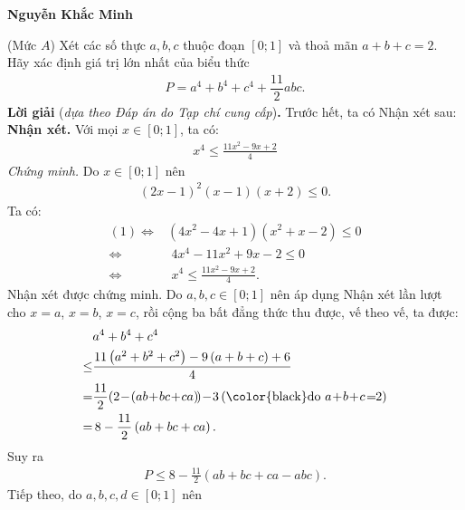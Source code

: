 \begin{multicols}{2}
	\begin{flushright}
		\textbf{\color{thachthuctoanhoc}Nguyễn Khắc Minh}
	\end{flushright}	
	{}
	(Mức $A$) Xét các số thực $a,b,c$ thuộc đoạn $[0;1]$ và thoả mãn $a+b+c=2$. Hãy xác định giá trị lớn nhất của biểu thức
	\begin{align*}
		P=a^4+b^4+c^4+\dfrac{11}2abc.
	\end{align*}
	\textbf{\color{thachthuctoanhoc}Lời giải} (\textit{dựa theo Đáp án do Tạp chí cung cấp})\textbf{\color{thachthuctoanhoc}.}
	\vskip 0.05cm
	Trước hết, ta có Nhận xét sau:
	\vskip 0.05cm
	\textbf{\color{thachthuctoanhoc}Nhận xét.} Với mọi $x \in [0;1]$,  ta có:
	\begin{align*}
		{x^4} \le \frac{{11{x^2} - 9x + 2}}{4}
	\end{align*}
	\textit{Chứng minh.} Do $x \in [0;1]$  nên
	\begin{align*}
		{\left( {2x - 1} \right)^2}\left( {x - 1} \right)\left( {x + 2} \right) \le 0. \tag{$1$}
	\end{align*}
	Ta có:
	\begin{align*}
		(1) \Leftrightarrow &\left( {4{x^2} - 4x + 1} \right)\left( {{x^2} + x - 2} \right) \le 0\\
		\Leftrightarrow &\,\, 4{x^4} - 11{x^2} + 9x - 2 \le 0\\
		\Leftrightarrow & \,\,{x^4} \le \frac{{11{x^2} - 9x + 2}}{4}.
	\end{align*}
	Nhận xét được chứng minh.
	\vskip 0.05cm
	Do $a,b,c \in [0;1]$ nên áp dụng Nhận xét lần lượt cho $x = a$, $x = b$, $x = c$, rồi cộng ba bất đẳng thức thu được, vế theo vế, ta được:
	\begin{align*}
			&{a^4} + {b^4} + {c^4} \\
			\le &\frac{{11\left( {{a^2} + {b^2} + {c^2}} \right) - 9\left( {a + b + c} \right) + 6}}{4}\\
			 = &\frac{{11}}{2}\!\left( {2 \!-\! \left( {ab \!+\! bc \!+\! ca} \right)\!} \right) \!-\! 3\left({{\text{\color{black}do }}a \!+\! b \!+\! c \!=\!\! 2} \right)\\
			 = &\,8 - \frac{{11}}{2}\left( {ab + bc + ca} \right).
	\end{align*}
	Suy ra
	\begin{align*}
		P \le 8 - \frac{{11}}{2}\left( {ab + bc + ca - abc} \right).
	\end{align*}
	Tiếp theo, do  $a,b,c,d \in [0;1]$ nên
	\begin{align*}

\end{align*}
\end{multicols}
